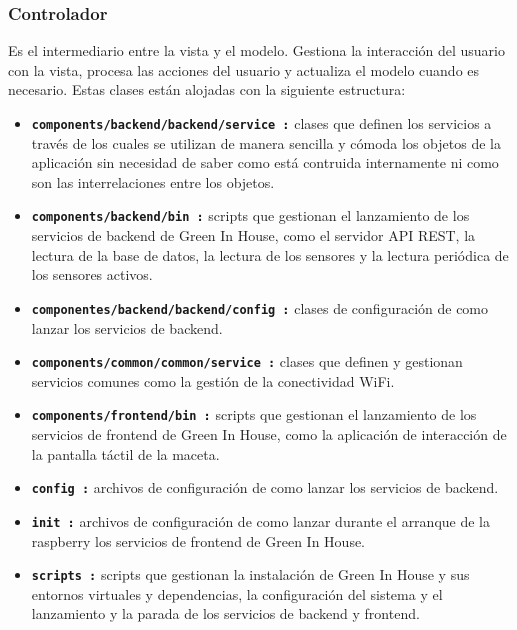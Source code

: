         \subsubsection{Controlador} 
        Es el intermediario entre la vista y el modelo. Gestiona la interacción del usuario con la vista, procesa las acciones del usuario y actualiza el modelo cuando es necesario. Estas clases están alojadas con la siguiente estructura:
        \begin{itemize}
            \item \textbf{\texttt{components/backend/backend/service :}} clases que definen los servicios a través de los cuales se utilizan de manera sencilla y cómoda los objetos de la aplicación sin necesidad de saber como está contruida internamente ni como son las interrelaciones entre los objetos. 
            \item \textbf{\texttt{components/backend/bin :}} scripts que gestionan el lanzamiento de los servicios de backend de Green In House, como el servidor API REST, la lectura de la base de datos, la lectura de los sensores y la lectura periódica de los sensores activos.
            \item \textbf{\texttt{componentes/backend/backend/config :}} clases de configuración de como lanzar los servicios de backend.
            \item \textbf{\texttt{components/common/common/service :}} clases que definen y gestionan servicios comunes como la gestión de la conectividad WiFi.
            \item \textbf{\texttt{components/frontend/bin :}} scripts que gestionan el lanzamiento de los servicios de frontend de Green In House, como la aplicación de interacción de la pantalla táctil de la maceta.
            \item \textbf{\texttt{config :}} archivos de configuración de como lanzar los servicios de backend.
            \item \textbf{\texttt{init :}} archivos de configuración de como lanzar durante el arranque de la raspberry los servicios de frontend de Green In House.
            \item \textbf{\texttt{scripts :}} scripts que gestionan la instalación de Green In House y sus entornos virtuales y dependencias, la configuración del sistema y el lanzamiento y la parada de los servicios de backend y frontend.
        \end{itemize}
        
